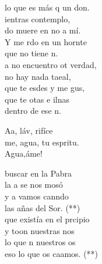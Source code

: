 \documentclass[12pt]{article}
\begin{document}
\begin{multicols*}{2}
\begin{cancion}
	lo que es más q un don.\\
\jump
	ientras  contemplo, \\
	do muere en no a mí.\\
	Y me rdo en un hornte \\
	que no tiene n. \\
\jump
	a no encuentro ot verdad,\\
	 no hay nada taeal,\\
	que te esdes y me gus,\\
	que te otas e ilnas\\
	dentro de ese n.\\
\end{cancion}%

\begin{cancion}%
	Aa, láv, rifíce\\
	me, agua, tu espritu.\\
	Agua,áme!\\
\end{cancion}%

\begin{cancion}%
	 buscar en la Pabra\\
	la a se nos mosó\\
	y a  vamos canndo \\
	las añas del Sor. (**) \\
\jump
	 que existía en el prcipio \\
	y toon nuestras nos\\
	lo que n nuestros os \\
	eso lo que os caamos. (**)\\
\end{cancion}%


\end{multicols*}
\end{document}
